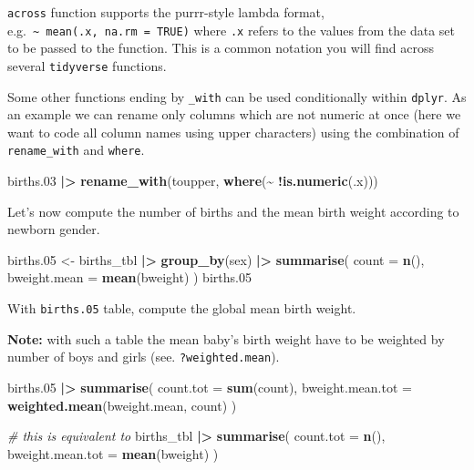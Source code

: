 \documentclass[
]{book}
\newenvironment{Shaded}{\begin{snugshade}}{\end{snugshade}}
\newcommand{\AttributeTok}[1]{\textcolor[rgb]{0.13,0.29,0.53}{#1}}
\newcommand{\CommentTok}[1]{\textcolor[rgb]{0.56,0.35,0.01}{\textit{#1}}}
\newcommand{\FloatTok}[1]{\textcolor[rgb]{0.00,0.00,0.81}{#1}}
\newcommand{\FunctionTok}[1]{\textcolor[rgb]{0.13,0.29,0.53}{\textbf{#1}}}
\newcommand{\NormalTok}[1]{#1}
\newcommand{\OtherTok}[1]{\textcolor[rgb]{0.56,0.35,0.01}{#1}}
\newcommand{\SpecialCharTok}[1]{\textcolor[rgb]{0.81,0.36,0.00}{\textbf{#1}}}
\begin{document}
\texttt{across} function supports the purrr-style lambda format, e.g.~\texttt{\textasciitilde{}\ mean(.x,\ na.rm\ =\ TRUE)}
where \texttt{.x} refers to the values from the data set to be passed to the function. This is a common notation you will find across several \texttt{tidyverse} functions.

Some other functions ending by \texttt{\_with} can be used conditionally within \texttt{dplyr}.
As an example we can rename only columns which are not numeric at once (here we want to code all column names using upper characters) using
the combination of \texttt{rename\_with} and \texttt{where}.

\begin{Shaded}
\begin{Highlighting}[]
\NormalTok{births}\FloatTok{.03} \SpecialCharTok{|\textgreater{}}
  \FunctionTok{rename\_with}\NormalTok{(toupper, }\FunctionTok{where}\NormalTok{(}\SpecialCharTok{\textasciitilde{}} \SpecialCharTok{!}\FunctionTok{is.numeric}\NormalTok{(.x)))}
\end{Highlighting}
\end{Shaded}

Let's now compute the number of births and the mean birth weight according to newborn gender.

\begin{Shaded}
\begin{Highlighting}[]
\NormalTok{births}\FloatTok{.05} \OtherTok{\textless{}{-}}
\NormalTok{  births\_tbl }\SpecialCharTok{|\textgreater{}}
  \FunctionTok{group\_by}\NormalTok{(sex) }\SpecialCharTok{|\textgreater{}}
  \FunctionTok{summarise}\NormalTok{(}
    \AttributeTok{count =} \FunctionTok{n}\NormalTok{(),}
    \AttributeTok{bweight.mean =} \FunctionTok{mean}\NormalTok{(bweight)}
\NormalTok{  )}
\NormalTok{births}\FloatTok{.05}
\end{Highlighting}
\end{Shaded}

With \texttt{births.05} table, compute the global mean birth weight.

\textbf{Note:} with such a table the mean baby's birth weight have to be weighted by number of boys and girls (see. \texttt{?weighted.mean}).

\begin{Shaded}
\begin{Highlighting}[]
\NormalTok{births}\FloatTok{.05} \SpecialCharTok{|\textgreater{}}
  \FunctionTok{summarise}\NormalTok{(}
    \AttributeTok{count.tot =} \FunctionTok{sum}\NormalTok{(count),}
    \AttributeTok{bweight.mean.tot =} \FunctionTok{weighted.mean}\NormalTok{(bweight.mean, count)}
\NormalTok{  )}

\CommentTok{\# this is equivalent to}
\NormalTok{births\_tbl }\SpecialCharTok{|\textgreater{}}
  \FunctionTok{summarise}\NormalTok{(}
    \AttributeTok{count.tot =} \FunctionTok{n}\NormalTok{(),}
    \AttributeTok{bweight.mean.tot =} \FunctionTok{mean}\NormalTok{(bweight)}
\NormalTok{  )}
\end{Highlighting}
\end{Shaded}
\end{document}
